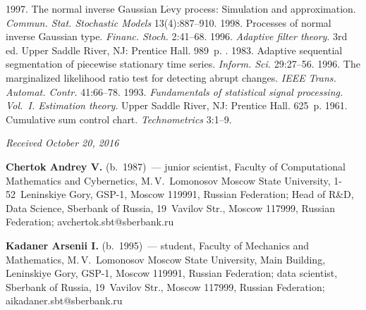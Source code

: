 \begin{multicols}{2}
{{\begin{thebibliography}{99}
 1997. The normal inverse Gaussian L$\acute{\mbox{e}}$vy process: 
Simulation and approximation. \textit{Commun. Stat. Stochastic Models} 
13(4):887--910.
 1998. Processes of normal inverse Gaussian type. 
\textit{Financ.  Stoch.} 2:41--68.
 1996. \textit{Adaptive filter theory}. 3rd ed. 
Upper Saddle River, NJ: Prentice Hall. 989~p.
. 1983. 
Adaptive sequential segmentation of piecewise stationary time series.  
\textit{Inform. Sci.} 29:27--56.
 1996. The marginalized likelihood ratio test for 
detecting abrupt changes. \textit{IEEE Trans. Automat. Contr.} 41:66--78.
 1993. \textit{Fundamentals of statistical signal processing. Vol.~I. 
Estimation theory}.  Upper Saddle River, NJ: Prentice Hall. 625~p.
 1961. Cumulative sum control chart. 
\textit{Technometrics} 3:1--9.
\end{thebibliography}

 }
 }

\end{multicols}

\vspace*{-6pt}

\hfill{\small\textit{Received October 20, 2016}}

\vspace*{-18pt}

\Contr

\vspace*{-2pt}

\noindent
\textbf{Chertok Andrey V.} (b.\ 1987)~--- 
junior scientist, Faculty of Computational Mathematics and Cybernetics, 
M.\,V.~Lo\-monosov Moscow State University, 1-52~Leninskiye Gory, GSP-1, Moscow 119991, 
Russian Federation; Head of R\&D, Data Science, Sberbank of Russia, 19~Vavilov Str.,
Moscow 117999, Russian Federation; \mbox{avchertok.sbt@sberbank.ru}

 \vspace*{1pt}
 
\noindent
\textbf{Kadaner Arsenii I.} (b.\ 1995)~--- 
student, Faculty of Mechanics and Mathematics, 
M.\,V.~Lomonosov Moscow State University, 
Main Building, Leninskiye Gory, GSP-1, Moscow 119991, Russian Federation; 
data scientist, Sberbank of Russia, 19~Vavilov Str., Moscow 117999, 
Russian Federation; \mbox{aikadaner.sbt@sberbank.ru}

